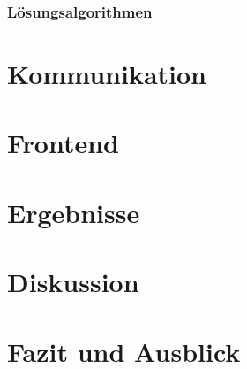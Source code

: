 \documentclass[12pt,a4paper]{article}
\begin{document}
\subsubsection{Lösungsalgorithmen}


\section{Kommunikation}


\section{Frontend}


\section{Ergebnisse}

\section{Diskussion}

\section{Fazit und Ausblick}





\end{document}
